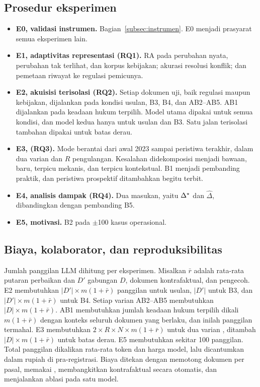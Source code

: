 
\subsection{Prosedur eksperimen}
\label{subsec:prosedur}

\begin{itemize}[leftmargin=*,nosep]
  \item \textbf{E0, validasi instrumen.} Bagian~\ref{subsec:instrumen}. E0 menjadi prasyarat semua eksperimen lain.
  \item \textbf{E1, adaptivitas representasi (RQ1).} RA pada perubahan nyata, perubahan tak terlihat, dan korpus kebijakan; akurasi resolusi konflik; dan pemetaan riwayat  ke regulasi pemicunya.
  \item \textbf{E2, akuisisi terisolasi (RQ2).} Setiap dokumen uji, baik regulasi maupun kebijakan, dijalankan pada kondisi usulan, B3, B4, dan AB2--AB5. AB1 dijalankan pada keadaan hukum terpilih. Model utama dipakai untuk semua kondisi, dan model kedua hanya untuk usulan dan B3. Satu jalan terisolasi tambahan dipakai untuk batas derau.
  \item \textbf{E3,  (RQ3).} Mode berantai dari  awal 2023 sampai peristiwa terakhir, dalam dua varian  dan $R$ pengulangan. Kesalahan didekomposisi menjadi bawaan, baru, terpicu mekanis, dan terpicu kontekstual. B1 menjadi pembanding praktik, dan peristiwa prospektif ditambahkan begitu terbit.
  \item \textbf{E4, analisis dampak (RQ4).} Dua masukan, yaitu $\Delta^{\star}$ dan $\hat{\Delta}$, dibandingkan dengan pembanding B5.
  \item \textbf{E5, motivasi.} B2 pada $\pm$100 kasus operasional.
\end{itemize}

\subsection{Biaya, kolaborator, dan reproduksibilitas}
\label{subsec:biaya}

Jumlah panggilan LLM dihitung per eksperimen. Misalkan $\bar{r}$ adalah rata-rata putaran perbaikan dan $D'$ gabungan $D$, dokumen kontrafaktual, dan pengecoh. E2 membutuhkan $|D'| \times m(1+\bar{r})$ panggilan untuk usulan, $|D'|$ untuk B3, dan $|D'| \times m(1+\bar{r})$ untuk B4. Setiap varian AB2--AB5 membutuhkan $|D| \times m(1+\bar{r})$. AB1 membutuhkan jumlah keadaan hukum terpilih dikali $m(1+\bar{r})$ dengan konteks seluruh dokumen yang berlaku, dan inilah panggilan termahal. E3 membutuhkan $2 \times R \times N \times m(1+\bar{r})$ untuk dua varian , ditambah $|D| \times m(1+\bar{r})$ untuk batas derau. E5 membutuhkan sekitar 100 panggilan. Total panggilan dikalikan rata-rata token dan harga model, lalu dicantumkan dalam rupiah di pra-registrasi. Biaya ditekan dengan memotong dokumen per pasal, memakai , membangkitkan kontrafaktual secara otomatis, dan menjalankan ablasi pada satu model.

